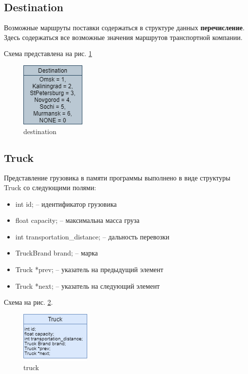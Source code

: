 \subsection{Destination}


Возможные маршруты поставки содержаться в структуре данных  \textbf{перечисление}.
Здесь содержаться все возможные значения маршрутов транспортной компании. 

Схема представлена на рис. \ref{destination}

\begin{figure}[hpt!]
    \centering
    \includegraphics[width=0.4\linewidth]{photo/data_structures/destination}
    \caption{destination}
    \label{destination}
\end{figure}

\subsection{Truck}

Представление грузовика в памяти программы выполнено в виде структуры Truck со следующими полями:

\begin{itemize}
    \item int id; -- идентификатор грузовика
    \item float capacity; -- максимальна масса груза
    \item int transportation\_distance; -- дальность перевозки
    \item TruckBrand brand; -- марка
    \item Truck *prev; -- указатель на предыдущий элемент
    \item Truck *next; -- указатель  на следующий элемент
\end{itemize}

Схема на рис. \ref{truck}.

\begin{figure}[H]
    \centering
    \includegraphics[width=0.4\linewidth]{photo/data_structures/truck}
    \caption{truck}
    \label{truck}
\end{figure}

